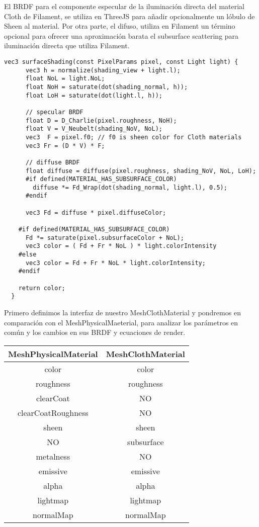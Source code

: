   El BRDF para el componente especular de la iluminaci\'on directa del material Cloth de Filament,
  se utiliza en ThreeJS para a\~nadir opcionalmente un l\'obulo de Sheen al material. Por otra
  parte, el difuso, utiliza en Filament un t\'ermino opcional para ofrecer una aproximaci\'on
  barata el subsurface scattering para iluminaci\'on directa que utiliza Filament.\newline
  
  \begin{lstlisting}[caption=Implementaci\'on del BRDF de iluminaci\'on directa de Filament]
    vec3 surfaceShading(const PixelParams pixel, const Light light) {
      vec3 h = normalize(shading_view + light.l);
      float NoL = light.NoL;
      float NoH = saturate(dot(shading_normal, h));
      float LoH = saturate(dot(light.l, h));
  
      // specular BRDF
      float D = D_Charlie(pixel.roughness, NoH);
      float V = V_Neubelt(shading_NoV, NoL);
      vec3  F = pixel.f0; // f0 is sheen color for Cloth materials 
      vec3 Fr = (D * V) * F;
  
      // diffuse BRDF
      float diffuse = diffuse(pixel.roughness, shading_NoV, NoL, LoH);
      #if defined(MATERIAL_HAS_SUBSURFACE_COLOR)
        diffuse *= Fd_Wrap(dot(shading_normal, light.l), 0.5);
      #endif
  
      vec3 Fd = diffuse * pixel.diffuseColor;
  
    #if defined(MATERIAL_HAS_SUBSURFACE_COLOR)
      Fd *= saturate(pixel.subsurfaceColor + NoL);
      vec3 color = ( Fd + Fr * NoL ) * light.colorIntensity
    #else
      vec3 color = Fd + Fr * NoL * light.colorIntensity;
    #endif
  
    return color;
  }
  \end{lstlisting}
  
  Primero definimos la interfaz de nuestro MeshClothMaterial y pondremos en comparaci\'on con
  el MeshPhysicalMaeterial, para analizar los par\'ametros en com\'un y los cambios en sus BRDF
  y ecuaciones de render.\newline
  
  \centering
  \begin{tabular}{| c | c |}
    \hline
    MeshPhysicalMaterial & MeshClothMaterial \\ \hline
    color & color \\
    roughness & roughness \\
    clearCoat & NO \\
    clearCoatRoughness & NO \\
    sheen  & sheen  \\
    NO  & subsurface  \\
    metalness & NO \\
    emissive & emissive \\
    alpha & alpha \\
    lightmap & lightmap \\
    normalMap & normalMap \\ \hline
  \end{tabular}\\
\egroup


